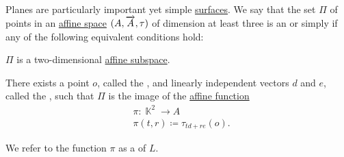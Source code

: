 \begin{definition}\label{def:affine_plane}\mimprovised
  Planes are particularly important yet simple \hyperref[con:geometric_shape]{surfaces}. We say that the set \( \Pi \) of points in an \hyperref[def:affine_space]{affine space} \( (A, \overrightarrow{A}, \tau) \) of dimension at least three is an  or simply  if any of the following equivalent conditions hold:

  \begin{thmenum}
     \( \Pi \) is a two-dimensional \hyperref[def:affine_subspace]{affine subspace}.

     There exists a point \( o \), called the , and linearly independent vectors \( d \) and \( e \), called the , such that \( \Pi \) is the image of the \hyperref[def:affine_operator]{affine function}
    \begin{equation}\label{eq:def:affine_plane/parametric}
      \begin{aligned}
        &\pi: \BbbK^2 \to A \\
        &\pi(t, r) \coloneqq \tau_{t d + r e}(o).
      \end{aligned}
    \end{equation}

    We refer to the function \( \pi \) as a  of \( L \).
  \end{thmenum}
\end{definition}
